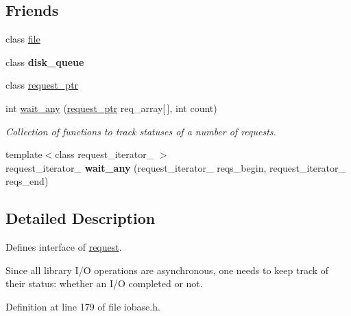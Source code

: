 \subsection*{Friends}
\begin{CompactItemize}
\item 
\hypertarget{group__iolayer_g686a90482e62dd1618201a3c79f9aae6}{
class \hyperlink{group__iolayer_g686a90482e62dd1618201a3c79f9aae6}{file}}
\label{group__iolayer_g686a90482e62dd1618201a3c79f9aae6}

\item 
\hypertarget{group__iolayer_g04639cad0832bf1448ee1bb4976a05c9}{
class \textbf{disk\_\-queue}}
\label{group__iolayer_g04639cad0832bf1448ee1bb4976a05c9}

\item 
\hypertarget{group__iolayer_g41c8636643792c137da130157a9ca431}{
class \hyperlink{group__iolayer_g41c8636643792c137da130157a9ca431}{request\_\-ptr}}
\label{group__iolayer_g41c8636643792c137da130157a9ca431}

\item 
int \hyperlink{classrequest_7a455713cd840b099075368af3f30ff5}{wait\_\-any} (\hyperlink{classrequest__ptr}{request\_\-ptr} req\_\-array\mbox{[}$\,$\mbox{]}, int count)
\begin{CompactList}\small\item\em Collection of functions to track statuses of a number of requests. \item\end{CompactList}\item 
\hypertarget{group__iolayer_g2bfbfc0bc801311fd2933969ca786fef}{
{\footnotesize template$<$class request\_\-iterator\_\- $>$ }\\request\_\-iterator\_\- \textbf{wait\_\-any} (request\_\-iterator\_\- reqs\_\-begin, request\_\-iterator\_\- reqs\_\-end)}
\label{group__iolayer_g2bfbfc0bc801311fd2933969ca786fef}

\end{CompactItemize}


\subsection{Detailed Description}
Defines interface of \hyperlink{classrequest}{request}. 

Since all library I/O operations are asynchronous, one needs to keep track of their status: whether an I/O completed or not. 

Definition at line 179 of file iobase.h.

